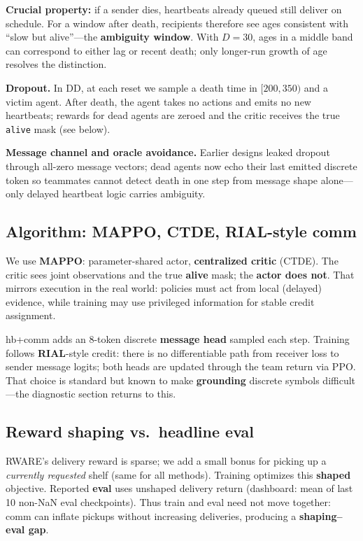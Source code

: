 \documentclass[conference,onecolumn]{IEEEtran}
\begin{document}
\textbf{Crucial property:} if a sender dies, heartbeats already queued still deliver on schedule. For a window after death, recipients therefore see ages consistent with ``slow but alive''---the \textbf{ambiguity window}. With $D{=}30$, ages in a middle band can correspond to either lag or recent death; only longer-run growth of age resolves the distinction.

\textbf{Dropout.} In DD, at each reset we sample a death time in $[200,350)$ and a victim agent. After death, the agent takes no actions and emits no new heartbeats; rewards for dead agents are zeroed and the critic receives the true \texttt{alive} mask (see below).

\textbf{Message channel and oracle avoidance.} Earlier designs leaked dropout through all-zero message vectors; dead agents now echo their last emitted discrete token so teammates cannot detect death in one step from message shape alone---only delayed heartbeat logic carries ambiguity.

\subsection{Algorithm: MAPPO, CTDE, RIAL-style comm}

We use \textbf{MAPPO}: parameter-shared actor, \textbf{centralized critic} (CTDE). The critic sees joint observations and the true \textbf{alive} mask; the \textbf{actor does not}. That mirrors execution in the real world: policies must act from local (delayed) evidence, while training may use privileged information for stable credit assignment.

hb+comm adds an 8-token discrete \textbf{message head} sampled each step. Training follows \textbf{RIAL}-style credit: there is no differentiable path from receiver loss to sender message logits; both heads are updated through the team return via PPO. That choice is standard but known to make \textbf{grounding} discrete symbols difficult---the diagnostic section returns to this.

\subsection{Reward shaping vs.\ headline eval}

RWARE's delivery reward is sparse; we add a small bonus for picking up a \emph{currently requested} shelf (same for all methods). Training optimizes this \textbf{shaped} objective. Reported \textbf{eval} uses unshaped delivery return (dashboard: mean of last 10 non-NaN eval checkpoints). Thus train and eval need not move together: comm can inflate pickups without increasing deliveries, producing a \textbf{shaping--eval gap}.
\end{document}
